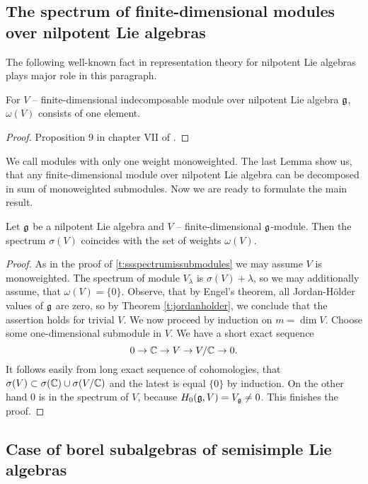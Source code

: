\subsection{The spectrum of finite-dimensional modules over nilpotent Lie algebras}
The following well-known fact in representation theory for nilpotent Lie algebras plays major role
in this paragraph.
\begin{lemma} \label{l:nilpdecomp}
    For $V$ -- finite-dimensional indecomposable module over nilpotent Lie algebra $\mathfrak{g}$,
    $\omega(V)$ consists of one element.
\end{lemma}
\begin{proof}
    Proposition 9 in chapter VII of \cite{bourbaki}.
\end{proof}
We call modules with only one weight monoweighted. The last Lemma show us, that any
finite-dimensional module over nilpotent Lie algebra can be decomposed in sum of monoweighted
submodules.  Now we are ready to formulate the main result.
\begin{theorem}
    Let $\mathfrak{g}$ be a nilpotent Lie algebra and $V$ -- finite-dimensional $\mathfrak{g}$-module. Then the
    spectrum $\sigma(V)$ coincides with the set of weights $\omega(V)$.
\end{theorem}
\begin{proof}
    As in the proof of \ref{t:ssspectrumissubmodules} we may assume $V$ is monoweighted. The
    spectrum of module $V_{\lambda}$ is $\sigma(V) + \lambda$, so we may additionally assume, that
    $\omega(V) = \{0\}$. Observe, that by Engel's theorem, all Jordan-H{\"o}lder values of $\mathfrak{g}$
    are zero, so by Theorem \ref{t:jordanholder}, we conclude that the assertion holds for trivial
    $V$. We now proceed by induction on $m = \dim V$. Choose some one-dimensional submodule in $V$.
    We have a short exact sequence
    \[
        0\to \mathbb{C} \to V \to V/\mathbb{C} \to 0.
    \]
    It follows easily from long exact sequence of cohomologies, that $\sigma(V) \subset
    \sigma(\mathbb{C}) \cup \sigma(V/\mathbb{C})$ and the latest is equal $\{0\}$ by induction. On the other hand
    $0$ is in the spectrum of $V$, because $H_0(\mathfrak{g}, V) = V_{\mathfrak{g}} \neq 0$. This finishes the
    proof.
\end{proof}

\subsection{Case of borel subalgebras of semisimple Lie algebras}

